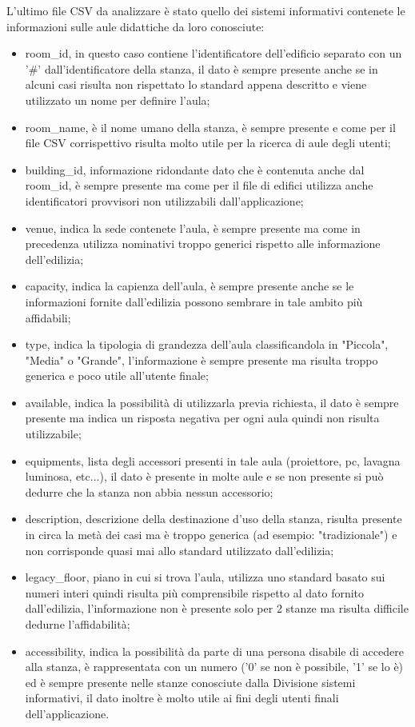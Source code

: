 \documentclass[12pt]{report}
\begin{document}
L'ultimo file CSV da analizzare è stato quello dei sistemi informativi contenete le informazioni sulle aule didattiche da loro conosciute:
\begin{itemize}
\item room\_id, in questo caso contiene l'identificatore dell'edificio separato con un '\#' dall'identificatore della stanza, il dato è sempre presente anche se in alcuni casi risulta non rispettato lo standard appena descritto e viene utilizzato un nome per definire l'aula;
\item room\_name, è il nome umano della stanza, è sempre presente e come per il file CSV corrispettivo risulta molto utile per la ricerca di aule degli utenti;
\item building\_id, informazione ridondante dato che è contenuta anche dal room\_id, è sempre presente ma come per il file di edifici utilizza anche identificatori provvisori non utilizzabili dall'applicazione;
\item venue, indica la sede contenete l'aula, è sempre presente ma come in precedenza utilizza nominativi troppo generici rispetto alle informazione dell'edilizia;
\item capacity, indica la capienza dell'aula, è sempre presente anche se le informazioni fornite dall'edilizia possono sembrare in tale ambito più affidabili;
\item type, indica la tipologia di grandezza dell'aula classificandola in "Piccola", "Media" o "Grande", l'informazione è sempre presente ma risulta troppo generica e poco utile all'utente finale;
\item available, indica la possibilità di utilizzarla previa richiesta, il dato è sempre presente ma indica un risposta negativa per ogni aula quindi non risulta utilizzabile;
\item equipments, lista degli accessori presenti in tale aula (proiettore, pc, lavagna luminosa, etc...), il dato è presente in molte aule e se non presente si può dedurre che la stanza non abbia nessun accessorio;
\item description, descrizione della destinazione d'uso della stanza, risulta presente in circa la metà dei casi ma è troppo generica (ad esempio: "tradizionale") e non corrisponde quasi mai allo standard utilizzato dall'edilizia;
\item legacy\_floor, piano in cui si trova l'aula, utilizza uno standard basato sui numeri interi quindi risulta più comprensibile rispetto al dato fornito dall'edilizia, l'informazione non è presente solo per 2 stanze ma risulta difficile dedurne l'affidabilità;
\item accessibility, indica la possibilità da parte di una persona disabile di accedere alla stanza, è rappresentata con un numero ('0' se non è possibile, '1' se lo è) ed è sempre presente nelle stanze conosciute dalla Divisione sistemi informativi, il dato inoltre è molto utile ai fini degli utenti finali dell'applicazione. 
\end{itemize}
\end{document}
